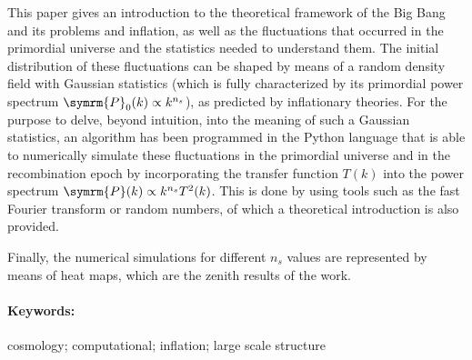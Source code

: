 This paper gives an introduction to the theoretical framework of the Big Bang and its problems and inflation, as well as the fluctuations that occurred in the primordial universe and the statistics needed to understand them. The initial distribution of these fluctuations can be shaped by means of a random density field with Gaussian statistics (which is fully characterized by its primordial power spectrum \(\symrm{P}_0(k)\propto k^{n_s}\)), as predicted by inflationary theories. For the purpose to delve, beyond intuition, into the meaning of such a Gaussian statistics, an algorithm has been programmed in the Python language that is able to numerically simulate these fluctuations in the primordial universe and in the recombination epoch by incorporating the transfer function \(T(k)\) into the power spectrum \(\symrm{P}(k)\propto k^{n_s}T^2(k)\). This is done by using tools such as the fast Fourier transform or random numbers, of which a theoretical introduction is also provided.

Finally, the numerical simulations for different \(n_s\) values are represented by means of heat maps, which are the zenith results of the work.
\paragraph{Keywords:} cosmology; computational; inflation; large scale structure